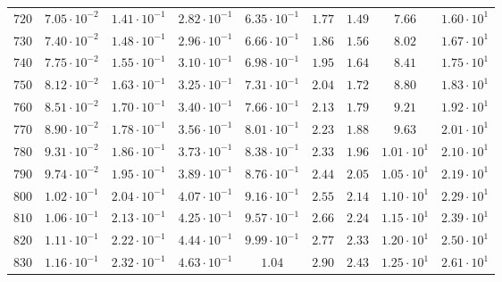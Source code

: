 \begin{landscape}
\begin{table}
\begin{tabular}{lcccccccc}
$	720	$ & $	7.05 \cdot 10^{-2} 	$ & $	1.41 \cdot 10^{-1} 	$ & $	2.82 \cdot 10^{-1} 	$ & $	6.35 \cdot 10^{-1} 	$ & $	1.77 	$ & $	1.49 	$ & $	7.66 	$ & $	1.60 \cdot 10^{1} 	 $ \\
$	730	$ & $	7.40 \cdot 10^{-2} 	$ & $	1.48 \cdot 10^{-1} 	$ & $	2.96 \cdot 10^{-1} 	$ & $	6.66 \cdot 10^{-1} 	$ & $	1.86 	$ & $	1.56 	$ & $	8.02 	$ & $	1.67 \cdot 10^{1} 	 $ \\
$	740	$ & $	7.75 \cdot 10^{-2} 	$ & $	1.55 \cdot 10^{-1} 	$ & $	3.10 \cdot 10^{-1} 	$ & $	6.98 \cdot 10^{-1} 	$ & $	1.95 	$ & $	1.64 	$ & $	8.41 	$ & $	1.75 \cdot 10^{1} 	 $ \\
$	750	$ & $	8.12 \cdot 10^{-2} 	$ & $	1.63 \cdot 10^{-1} 	$ & $	3.25 \cdot 10^{-1} 	$ & $	7.31 \cdot 10^{-1} 	$ & $	2.04 	$ & $	1.72 	$ & $	8.80 	$ & $	1.83 \cdot 10^{1} 	 $ \\
$	760	$ & $	8.51 \cdot 10^{-2} 	$ & $	1.70 \cdot 10^{-1} 	$ & $	3.40 \cdot 10^{-1} 	$ & $	7.66 \cdot 10^{-1} 	$ & $	2.13 	$ & $	1.79 	$ & $	9.21 	$ & $	1.92 \cdot 10^{1} 	 $ \\
$	770	$ & $	8.90 \cdot 10^{-2} 	$ & $	1.78 \cdot 10^{-1} 	$ & $	3.56 \cdot 10^{-1} 	$ & $	8.01 \cdot 10^{-1} 	$ & $	2.23 	$ & $	1.88 	$ & $	9.63 	$ & $	2.01 \cdot 10^{1} 	 $ \\
$	780	$ & $	9.31 \cdot 10^{-2} 	$ & $	1.86 \cdot 10^{-1} 	$ & $	3.73 \cdot 10^{-1} 	$ & $	8.38 \cdot 10^{-1} 	$ & $	2.33 	$ & $	1.96 	$ & $	1.01 \cdot 10^{1} 	$ & $	2.10 \cdot 10^{1} 	 $ \\
$	790	$ & $	9.74 \cdot 10^{-2} 	$ & $	1.95 \cdot 10^{-1} 	$ & $	3.89 \cdot 10^{-1} 	$ & $	8.76 \cdot 10^{-1} 	$ & $	2.44 	$ & $	2.05 	$ & $	1.05 \cdot 10^{1} 	$ & $	2.19 \cdot 10^{1} 	 $ \\
$	800	$ & $	1.02 \cdot 10^{-1} 	$ & $	2.04 \cdot 10^{-1} 	$ & $	4.07 \cdot 10^{-1} 	$ & $	9.16 \cdot 10^{-1} 	$ & $	2.55 	$ & $	2.14 	$ & $	1.10 \cdot 10^{1} 	$ & $	2.29 \cdot 10^{1} 	 $ \\
$	810	$ & $	1.06 \cdot 10^{-1} 	$ & $	2.13 \cdot 10^{-1} 	$ & $	4.25 \cdot 10^{-1} 	$ & $	9.57 \cdot 10^{-1} 	$ & $	2.66 	$ & $	2.24 	$ & $	1.15 \cdot 10^{1} 	$ & $	2.39 \cdot 10^{1} 	 $ \\
$	820	$ & $	1.11 \cdot 10^{-1} 	$ & $	2.22 \cdot 10^{-1} 	$ & $	4.44 \cdot 10^{-1} 	$ & $	9.99 \cdot 10^{-1} 	$ & $	2.77 	$ & $	2.33 	$ & $	1.20 \cdot 10^{1} 	$ & $	2.50 \cdot 10^{1} 	 $ \\
$	830	$ & $	1.16 \cdot 10^{-1} 	$ & $	2.32 \cdot 10^{-1} 	$ & $	4.63 \cdot 10^{-1} 	$ & $	1.04 	$ & $	2.90 	$ & $	2.43 	$ & $	1.25 \cdot 10^{1} 	$ & $	2.61 \cdot 10^{1} 	 $ \\

\end{tabular}
\end{table}
\end{landscape}
